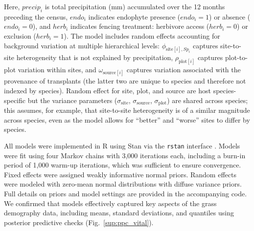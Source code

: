 \documentclass[12pt]{article}\usepackage[]{graphicx}\usepackage[dvipsnames]{xcolor}
\begin{document}
\noindent Here, $precip_i$ is total precipitation (mm) accumulated over the 12 months preceding the census, $endo_i$ indicates endophyte presence ($endo_i=1$) or absence ($endo_i=0$), and $herb_i$ indicates fencing treatment: herbivore access ($herb_i=0$) or exclusion ($herb_i=1$).
The model includes random effects accounting for background variation at multiple hierarchical levels: $\phi_{\text{site}[i],Sp_i}$ captures site-to-site heterogeneity that is not explained by precipitation, $\rho_{\text{plot}[i]}$ captures plot-to-plot variation within sites, and $\omega_{\text{source}[i]}$ captures variation associated with the provenance of transplants (the latter two are unique to species and therefore not indexed by species).
Random effect for site, plot, and source are host species-specific but the variance parameters ($\sigma_{\text{site}}$, $\sigma_{\text{source}}$, $\sigma_{\text{plot}}$) are shared across species; this assumes, for example, that site-to-site heterogeneity is of a similar magnitude across species, even as the model allows for ``better'' and ``worse'' sites to differ by species. 

All models were implemented in R \citep{RCoreTeam} using Stan via the \texttt{rstan} interface \citep{Rstan}. 
Models were fit using four Markov chains with 3,000 iterations each, including a burn-in period of 1,000 warm-up iterations, which was sufficient to ensure convergence.
Fixed effects were assigned weakly informative normal priors. Random effects were modeled with zero-mean normal distributions with diffuse variance priors. 
Full details on priors and model settings are provided in the accompanying code.
We confirmed that models effectively captured key aspects of the grass demography data, including means, standard deviations, and quantiles  using posterior predictive checks (Fig.~\ref{sup:ppc_vital}).
\end{document}
